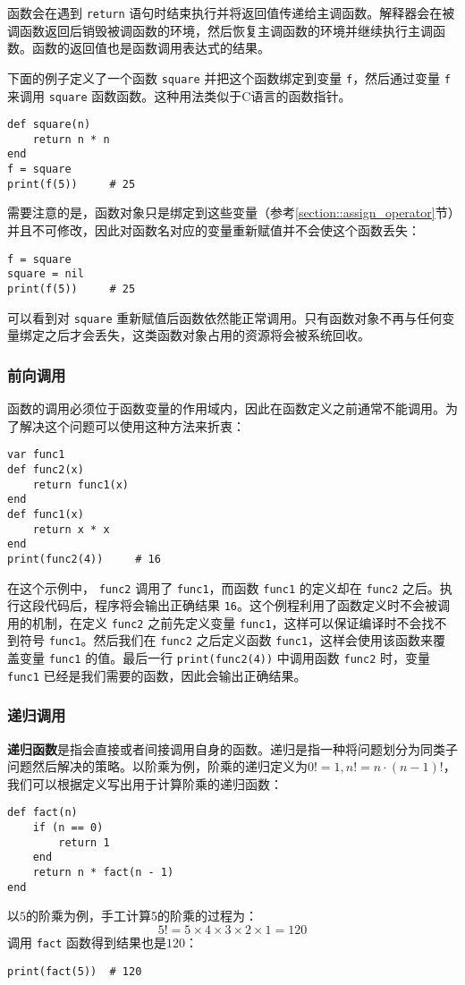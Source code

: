 函数会在遇到 \texttt{return} 语句时结束执行并将返回值传递给主调函数。解释器会在被调函数返回后销毁被调函数的环境，然后恢复主调函数的环境并继续执行主调函数。函数的返回值也是函数调用表达式的结果。

下面的例子定义了一个函数 \texttt{square} 并把这个函数绑定到变量 \texttt{f}，然后通过变量 \texttt{f} 来调用 \texttt{square} 函数函数。这种用法类似于C语言的函数指针。
\begin{lstlisting}[language=berry, numbers=none]
def square(n)
    return n * n
end
f = square
print(f(5))     # 25
\end{lstlisting}
需要注意的是，函数对象只是绑定到这些变量（参考\ref{section::assign_operator}节）并且不可修改，因此对函数名对应的变量重新赋值并不会使这个函数丢失：
\begin{lstlisting}[language=berry, numbers=none]
f = square
square = nil
print(f(5))     # 25
\end{lstlisting}
可以看到对 \texttt{square} 重新赋值后函数依然能正常调用。只有函数对象不再与任何变量绑定之后才会丢失，这类函数对象占用的资源将会被系统回收。

\subsubsection{前向调用}

函数的调用必须位于函数变量的作用域内，因此在函数定义之前通常不能调用。为了解决这个问题可以使用这种方法来折衷：
\begin{lstlisting}[language=berry]
var func1
def func2(x)
    return func1(x)
end
def func1(x)
    return x * x
end
print(func2(4))     # 16
\end{lstlisting}
在这个示例中， \texttt{func2} 调用了 \texttt{func1}，而函数 \texttt{func1} 的定义却在 \texttt{func2} 之后。执行这段代码后，程序将会输出正确结果 \texttt{16}。这个例程利用了函数定义时不会被调用的机制，在定义 \texttt{func2} 之前先定义变量 \texttt{func1}，这样可以保证编译时不会找不到符号 \texttt{func1}。然后我们在 \texttt{func2} 之后定义函数 \texttt{func1}，这样会使用该函数来覆盖变量 \texttt{func1} 的值。最后一行 \texttt{print(func2(4))} 中调用函数 \texttt{func2} 时，变量 \texttt{func1} 已经是我们需要的函数，因此会输出正确结果。

\subsubsection{递归调用}

\textbf{递归函数}是指会直接或者间接调用自身的函数。递归是指一种将问题划分为同类子问题然后解决的策略。以阶乘为例，阶乘的递归定义为$0!=1, n!=n\cdot(n-1)!$，我们可以根据定义写出用于计算阶乘的递归函数：
\begin{lstlisting}[language=berry]
def fact(n)
    if (n == 0)
        return 1
    end
    return n * fact(n - 1)
end
\end{lstlisting}
以$5$的阶乘为例，手工计算5的阶乘的过程为：
\begin{equation*}
5! = 5 \times 4 \times 3 \times 2 \times 1 = 120
\end{equation*}
调用 \texttt{fact} 函数得到结果也是$120$：
\begin{lstlisting}[language=berry, numbers=none]
print(fact(5))  # 120
\end{lstlisting}

